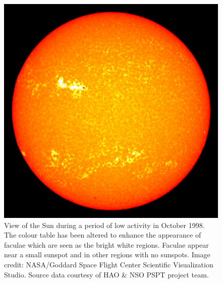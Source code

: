 \begin{figure}[t]
    \centering
    \includegraphics[scale=0.15]{Figures/1-Introduction/faculae_example.jpg}
    \caption[Example of faculae during a period of low activity on the Sun]{View of the Sun during a period of low activity in October 1998. The colour table has been altered to enhance the appearance of faculae which are seen as the bright white regions. Faculae appear near a small sunspot and in other regions with no sunspots. Image credit: NASA/Goddard Space Flight Center Scientific Visualization Studio. Source data courtesy of HAO \& NSO PSPT project team.}
    \label{fig:faculae_example}
\end{figure}

